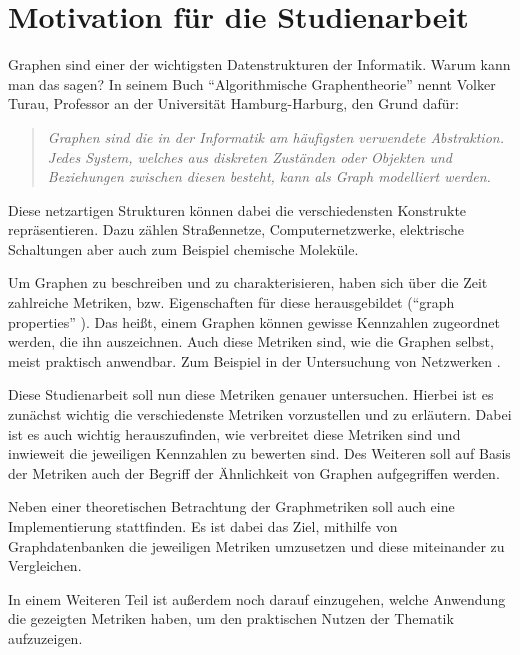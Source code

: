 \documentclass[a4paper,12pt,ngerman,chapterprefix=false,listof=totoc,bibliography=totoc]{scrreprt}
\newcommand{\zitat}[2]{
	\begin{quote}
		\textit{#1} \cite{#2}
	\end{quote}
}
\begin{document}
\section{Motivation für die Studienarbeit}{
Graphen sind einer der wichtigsten Datenstrukturen der Informatik. Warum kann man das sagen? In seinem Buch "`Algorithmische Graphentheorie"' nennt Volker Turau, Professor an der Universität Hamburg-Harburg, den Grund dafür: 
\zitat{Graphen sind die in der Informatik am häufigsten verwendete Abstraktion. Jedes System, welches aus diskreten Zuständen oder Objekten und Beziehungen zwischen diesen besteht, kann als Graph modelliert werden.}{turau_algorithmische_2004}
Diese netzartigen Strukturen können dabei die verschiedensten Konstrukte repräsentieren. Dazu zählen Straßennetze, Computernetzwerke, elektrische Schaltungen aber auch zum Beispiel chemische Moleküle. \cite{tittmann_graphentheorie_2019}

Um Graphen zu beschreiben und zu charakterisieren, haben sich über die Zeit zahlreiche Metriken, bzw. Eigenschaften für diese herausgebildet ("`graph properties"' \cite{lovasz_large_2012}). Das heißt, einem Graphen können gewisse Kennzahlen zugeordnet werden, die ihn auszeichnen. Auch diese Metriken sind, wie die Graphen selbst, meist praktisch anwendbar. Zum Beispiel in der Untersuchung von Netzwerken \cite{ellens_graph_2013}.

Diese Studienarbeit soll nun diese Metriken genauer untersuchen. Hierbei ist es zunächst wichtig die verschiedenste Metriken vorzustellen und zu erläutern. Dabei ist es auch wichtig herauszufinden, wie verbreitet diese Metriken sind und inwieweit die jeweiligen Kennzahlen zu bewerten sind. Des Weiteren soll auf Basis der Metriken auch der Begriff der Ähnlichkeit von Graphen aufgegriffen werden.

Neben einer theoretischen Betrachtung der Graphmetriken soll auch eine Implementierung stattfinden. Es ist dabei das Ziel, mithilfe von Graphdatenbanken die jeweiligen Metriken umzusetzen und diese miteinander zu Vergleichen.

In einem Weiteren Teil ist außerdem noch darauf einzugehen, welche Anwendung die gezeigten Metriken haben, um den praktischen Nutzen der Thematik aufzuzeigen.
}
\end{document}
